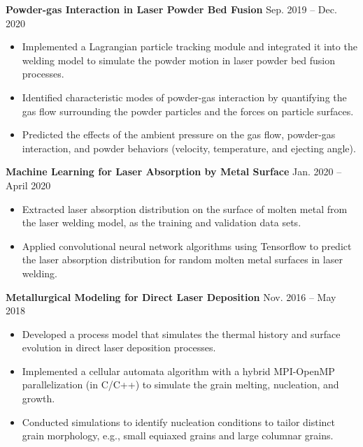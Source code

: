 \documentclass[11pt, letterpaper]{article}
\begin{document}
\vspace{3pt}
\textbf{Powder-gas Interaction in Laser Powder Bed Fusion} \hfill Sep. 2019 -- Dec. 2020
\begin{itemize}[leftmargin=*, labelsep=5mm]
   \item Implemented a Lagrangian particle tracking module and integrated it into the welding model
      to simulate the powder motion in laser powder bed fusion processes.
   \item Identified characteristic modes of powder-gas interaction by quantifying the gas flow
      surrounding the powder particles and the forces on particle surfaces.
   \item Predicted the effects of the ambient pressure on the gas flow, powder-gas interaction, and
      powder behaviors (velocity, temperature, and ejecting angle).
\end{itemize}

\vspace{3pt}

\textbf{Machine Learning for Laser Absorption by Metal Surface} \hfill Jan. 2020 -- April 2020
\begin{itemize}[leftmargin=*, labelsep=5mm]
   \item Extracted laser absorption distribution on the surface of molten metal from the laser
      welding model, as the training and validation data sets.
   \item Applied convolutional neural network algorithms using Tensorflow to predict the laser
      absorption distribution for random molten metal surfaces in laser welding.
\end{itemize}

\vspace{3pt}

\textbf{Metallurgical Modeling for Direct Laser Deposition} \hfill Nov. 2016 -- May 2018
\begin{itemize}[leftmargin=*, labelsep=5mm]
   \item Developed a process model that simulates the thermal history and surface evolution in
      direct laser deposition processes.
   \item Implemented a cellular automata algorithm with a hybrid MPI-OpenMP parallelization (in
      C/C++) to simulate the grain melting, nucleation, and growth. 
   \item Conducted simulations to identify nucleation conditions to tailor distinct grain
      morphology, e.g., small equiaxed grains and large columnar grains.
\end{itemize}
\end{document}

